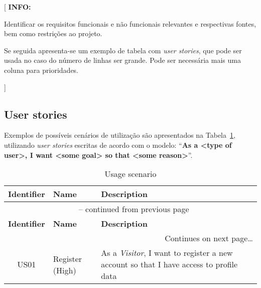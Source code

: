 \documentclass[11pt,a4paper]{report}
\newenvironment{info}[1]{\vspace*{6mm}\color{blue}[ \textbf{INFO:} \begin{em} #1}
                        {\vspace*{3mm}\end{em} ]}
\begin{document}
\begin{info}
Identificar os requisitos funcionais e não funcionais relevantes e respectivas fontes, bem como restrições ao projeto.

Se seguida apresenta-se um exemplo de tabela com \textit{user stories}, que pode ser usada no caso do número de linhas ser grande.
Pode ser necessária mais uma coluna para prioridades.
\end{info}

\subsection*{User stories}

Exemplos de possíveis cenários de utilização são apresentados na Tabela~\ref{tab:userstories}, utilizando \textit{user stories} escritas de acordo com o modelo: 
``\textbf{As a <type of user>, I want <some goal> so that <some reason>}''.

\begin{center}
\begin{longtable}{| c | p{18mm} | p{110mm} |}
\caption{Usage scenario} \label{tab:userstories} \\[-2mm] \hline

\textbf{Identifier} & \textbf{Name} & \textbf{Description} \\ \hline\hline
\endfirsthead

\multicolumn{3}{c}{{\tablename\ \thetable{} -- continued from previous page}} \\[2mm] \hline
\textbf{Identifier} & \textbf{Name} & \textbf{Description} \\ \hline\hline
\endhead

\multicolumn{3}{r}{{Continues on next page\ldots}} \\
\endfoot

\hline
\endlastfoot

US01 & Register (High) & As a \textit{Visitor}, I want to register a new account so that I have access to profile data  \\ \hline

% 

\end{longtable}
\end{center}
\end{document}
